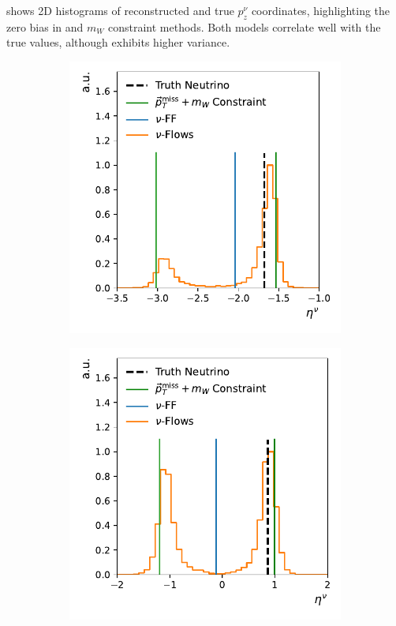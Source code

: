  shows 2D histograms of reconstructed and true $p_z^\nu$ coordinates, highlighting the zero bias in \nuff{} and $m_W$ constraint methods.
Both \nuflow{} models correlate well with the true values, although \nusample{} exhibits higher variance.

\begin{figure}[ht]
    \centering
    \begin{subfigure}{0.32\textwidth}
        \includegraphics[width=\textwidth]{Figures/neutrino_unfolding/eta_5.pdf}
        \caption{} \label{fig:inf_good}
    \end{subfigure}
        \begin{subfigure}{0.32\textwidth}
        \includegraphics[width=\textwidth]{Figures/neutrino_unfolding/eta_9.pdf}

\end{subfigure}
\end{figure}
